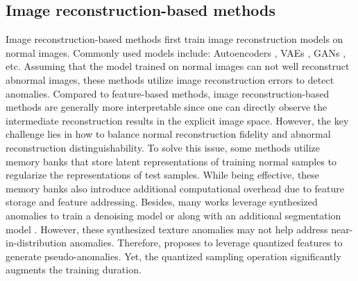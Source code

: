 \documentclass[5p, twocolumn]{elsarticle}[draft]
\begin{document}
\subsection{Image reconstruction-based methods}
\label{2.2}
Image reconstruction-based methods first train image reconstruction models on normal images. Commonly used models include: Autoencoders \cite{bergmann2018improving,collin2021improved,zavrtanik2021reconstruction}, VAEs \cite{venkataramanan2020attention}, GANs \cite{schlegl2019f}, etc. Assuming that the model trained on normal images can not well reconstruct abnormal images, these methods utilize image reconstruction errors to detect anomalies. Compared to feature-based methods, image reconstruction-based methods are generally more interpretable since one can directly observe the intermediate reconstruction results in the explicit image space. However, the key challenge lies in how to balance normal reconstruction fidelity and abnormal reconstruction distinguishability. To solve this issue, some methods \cite{gong2019memorizing,hou2021divide,wu2022self} utilize memory banks that store latent representations of training normal samples to regularize the representations of test samples. While being effective, these memory banks also introduce additional computational overhead due to feature storage and feature addressing. Besides, many works leverage synthesized anomalies to train a denoising model \cite{collin2021improved,zavrtanik2021draem} or along with an additional segmentation model \cite{zavrtanik2021draem}. However, these synthesized texture anomalies may not help address near-in-distribution \cite{zavrtanik2022dsr} anomalies. Therefore, \cite{zavrtanik2022dsr} proposes to leverage quantized features to generate pseudo-anomalies. Yet, the quantized sampling operation significantly augments the training duration.
\end{document}
